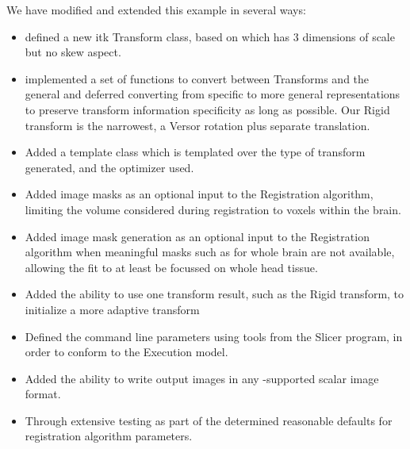 \documentclass{InsightArticle}
\begin{document}
\vspace{0.25in}\par
We have modified and extended this example in several ways:
\begin{itemize}
\item defined a new itk Transform class, based on 
which has $3$ dimensions of scale but no skew aspect.

\item implemented a set of functions to convert between 
  Transforms and the general  and deferred
  converting from specific to more general representations to preserve 
  transform information specificity as long as possible.  Our Rigid transform
  is the narrowest, a Versor rotation plus separate translation.

\item Added a template class
   which is templated
  over the type of  transform generated, and the optimizer
  used.

\item Added image masks as an optional input to the Registration
  algorithm, limiting the volume considered during registration to
  voxels within the brain.

\item Added image mask generation as an optional input to the Registration
  algorithm when meaningful masks such as for whole brain are not available, 
  allowing the fit to at least be focussed on whole head tissue.

\item Added the ability to use one transform result, such as the Rigid transform,
 to initialize a more adaptive transform

\item Defined the command line parameters using tools from the
  Slicer \cite{pieper:slicer3} program, in order to conform to the 
  Execution model.

\item Added the ability to write output images in any -supported scalar image format.

\item Through extensive testing as part of the \brainstwoprog{}
  determined reasonable defaults for registration algorithm parameters.
\end{itemize}
\vspace{0.25in}\par
\end{document}
